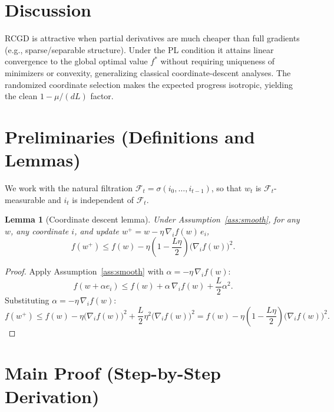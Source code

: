 \documentclass{article}
\newtheorem{lemma}{Lemma}
\begin{document}
\section*{Discussion}

RCGD is attractive when partial derivatives are much cheaper than full
gradients (e.g., sparse/separable structure). Under the PL condition it attains
linear convergence to the global optimal value $f^*$ without requiring
uniqueness of minimizers or convexity, generalizing classical coordinate-descent
analyses. The randomized coordinate selection makes the expected progress
isotropic, yielding the clean $1-\mu/(dL)$ factor.

\section*{Preliminaries (Definitions and Lemmas)}

We work with the natural filtration
$\mathcal{F}_t = \sigma(i_0,\dots,i_{t-1})$, so that $w_t$ is
$\mathcal{F}_t$-measurable and $i_t$ is independent of $\mathcal{F}_t$.

\begin{lemma}[Coordinate descent lemma]
\label{lem:descent}
Under Assumption~\ref{ass:smooth}, for any $w$, any coordinate $i$, and update
$w^+ = w - \eta\, \nabla_i f(w)\, e_i$,
\[
f(w^+) \le f(w) - \eta\left(1 - \frac{L\eta}{2}\right)\big(\nabla_i f(w)\big)^2 .
\]
\end{lemma}

\begin{proof}
Apply Assumption~\ref{ass:smooth} with $\alpha = -\eta\,\nabla_i f(w)$:
\[
f(w + \alpha e_i) \le f(w) + \alpha\,\nabla_i f(w) + \frac{L}{2}\alpha^2 .
\]
Substituting $\alpha = -\eta\,\nabla_i f(w)$:
\[
f(w^+) \le f(w) - \eta\big(\nabla_i f(w)\big)^2 + \frac{L}{2}\eta^2 \big(\nabla_i f(w)\big)^2
= f(w) - \eta\left(1 - \frac{L\eta}{2}\right)\big(\nabla_i f(w)\big)^2 .
\]
\end{proof}

\section*{Main Proof (Step-by-Step Derivation)}
\end{document}
